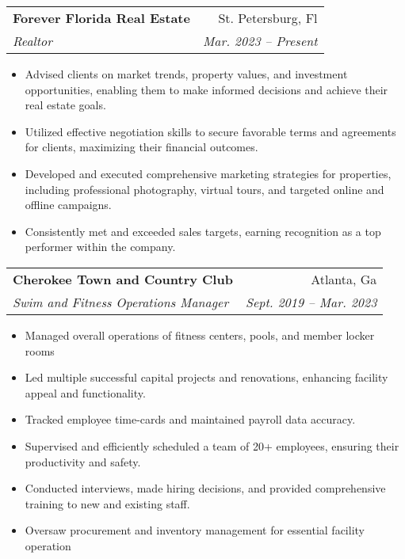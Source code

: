 \documentclass[letterpaper,11pt]{article}
\makeatletter
\newcommand{\resumeItem}[1]{
  \item\small{
    {#1 \vspace{-2pt}}
  }
}
\newcommand{\resumeJobheading}[4]{
  \vspace{-2pt}\item
    \begin{tabular*}{0.97\textwidth}[t]{l@{\extracolsep{\fill}}r}
      \textbf{#1} & #2 \\
      \textit{\small#3} & \textit{\small #4} \\
    \end{tabular*}\vspace{-7pt}
}
\newcommand{\resumeSubSubheading}[2]{
    \item
    \begin{tabular*}{0.97\textwidth}{l@{\extracolsep{\fill}}r}
      \textit{\small#1} & \textit{\small #2} \\
    \end{tabular*}\vspace{-7pt}
}
\newcommand{\resumeSubHeadingListEnd}{\end{itemize}}
\newcommand{\resumeItemListStart}{\begin{itemize}}
\newcommand{\resumeItemListEnd}{\end{itemize}\vspace{-5pt}}
\makeatother
\begin{document}
    \resumeJobheading
    {Forever Florida Real Estate}{St. Petersburg, Fl}
    {Realtor}{Mar. 2023 -- Present}
    \resumeItemListStart
        \resumeItem{Advised clients on market trends, property values, and investment opportunities, enabling them to make informed decisions and achieve their real estate goals.}
        \resumeItem{Utilized effective negotiation skills to secure favorable terms and agreements for clients, maximizing their financial outcomes.}
        \resumeItem{Developed and executed comprehensive marketing strategies for properties, including professional photography, virtual tours, and targeted online and offline campaigns.}
        \resumeItem{Consistently met and exceeded sales targets, earning recognition as a top performer within the company.}
    \resumeItemListEnd
    \resumeJobheading
    {Cherokee Town and Country Club}{Atlanta, Ga}
    {Swim and Fitness Operations Manager}{Sept. 2019 -- Mar. 2023}
    \resumeItemListStart
        \resumeItem{Managed overall operations of fitness centers, pools, and member locker rooms}
        \resumeItem{Led multiple successful capital projects and renovations, enhancing facility appeal and functionality.}
        \resumeItem{Tracked employee time-cards and maintained payroll data accuracy.}
        \resumeItem{Supervised and efficiently scheduled a team of 20+ employees, ensuring their productivity and safety.}
        \resumeItem{Conducted interviews, made hiring decisions, and provided comprehensive training to new and existing staff.}
        \resumeItem{Oversaw procurement and inventory management for essential facility operation}
    \resumeItemListEnd
        

   
\end{document}
